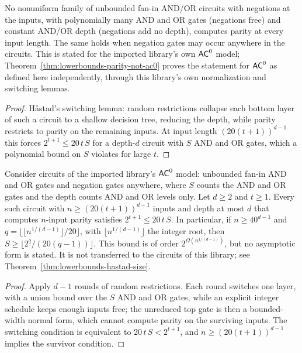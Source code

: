 \begin{theorem}
  \label{thm:lowerbounds-algebraic-parity-ac0}
  \leanok
  No nonuniform family of unbounded fan-in AND/OR circuits with negations at
  the inputs, with polynomially many AND and OR gates (negations free) and
  constant AND/OR depth (negations add no depth), computes parity at every
  input length. The same holds when negation gates may occur anywhere in the
  circuits. This is stated for the imported library's own $\mathsf{AC}^0$ model;
  Theorem~\ref{thm:lowerbounds-parity-not-ac0} proves the statement for
  $\mathsf{AC}^0$ as defined here independently, through this library's own
  normalization and switching lemmas.
\end{theorem}
\begin{proof}
  \leanok
  Håstad's switching lemma: random restrictions collapse each bottom layer
  of such a circuit to a shallow decision tree, reducing the depth, while
  parity restricts to parity on the remaining inputs. At input length
  $(20(t + 1))^{d - 1}$ this forces $2^{t + 1} \le 20\,t\,S$ for a depth-$d$
  circuit with $S$ AND and OR gates, which a polynomial bound on $S$ violates
  for large $t$.
\end{proof}

\begin{theorem}
  \label{thm:lowerbounds-algebraic-hastad}
  \leanok
  Consider circuits of the imported library's $\mathsf{AC}^0$ model: unbounded
  fan-in AND and OR gates and negation gates anywhere, where $S$ counts the AND
  and OR gates and the depth counts AND and OR levels only. Let $d \ge 2$ and
  $t \ge 1$. Every such circuit with $n \ge (20(t + 1))^{d - 1}$ inputs and
  depth at most $d$ that computes $n$-input parity satisfies
  $2^{t + 1} \le 20\,t\,S$. In particular, if $n \ge 40^{d - 1}$ and
  $q = \lfloor \lfloor n^{1/(d-1)} \rfloor / 20 \rfloor$, with
  $\lfloor n^{1/(d-1)} \rfloor$ the integer root, then
  $S \ge \lfloor 2^q / (20(q - 1)) \rfloor$. This bound is of order
  $2^{\Omega(n^{1/(d-1)})}$, but no asymptotic form is stated. It is not
  transferred to the circuits of this library; see
  Theorem~\ref{thm:lowerbounds-hastad-size}.
\end{theorem}
\begin{proof}
  \leanok
  Apply $d - 1$ rounds of random restrictions. Each round switches one layer,
  with a union bound over the $S$ AND and OR gates, while an explicit integer
  schedule keeps enough inputs free; the unreduced top gate is then a
  bounded-width normal form, which cannot compute parity on the surviving
  inputs. The switching condition is equivalent to $20\,t\,S < 2^{t + 1}$, and
  $n \ge (20(t + 1))^{d - 1}$ implies the survivor condition.
\end{proof}


